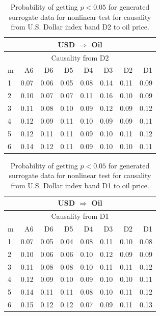 %
%
\begin{table}[H]
\begin{center}
\begin{tabular}{l|r r r r r r r}
\hline\hline
\multicolumn{8}{c}{USD $\Rightarrow$ Oil}\\
\hline
\multicolumn{8}{c}{Causality from D2}\\
\hline\hline
m & A6 & D6 & D5 & D4 & D3 & D2 & D1 \\
\hline
1 & 0.07 & 0.06 & 0.05 & 0.08 & 0.14 & 0.11 & 0.09 \\
2 & 0.10 & 0.07 & 0.07 & 0.11 & 0.16 & 0.10 & 0.09 \\
3 & 0.11 & 0.08 & 0.10 & 0.09 & 0.12 & 0.09 & 0.12 \\
4 & 0.12 & 0.09 & 0.11 & 0.10 & 0.09 & 0.09 & 0.11 \\
5 & 0.12 & 0.11 & 0.11 & 0.09 & 0.10 & 0.11 & 0.12 \\
6 & 0.14 & 0.12 & 0.11 & 0.09 & 0.10 & 0.10 & 0.11 \\
\hline\hline
\end{tabular}
\caption{Probability of getting $p < 0.05$ for generated surrogate data for nonlinear test for causality from U.S. Dollar index band D2 to oil price.}
\end{center}
\end{table}

%
%
\begin{table}[H]
\begin{center}
\begin{tabular}{l|r r r r r r r}
\hline\hline
\multicolumn{8}{c}{USD $\Rightarrow$ Oil}\\
\hline
\multicolumn{8}{c}{Causality from D1}\\
\hline\hline
m & A6 & D6 & D5 & D4 & D3 & D2 & D1 \\
\hline
1 & 0.07 & 0.05 & 0.04 & 0.08 & 0.11 & 0.10 & 0.08 \\
2 & 0.10 & 0.06 & 0.06 & 0.10 & 0.12 & 0.09 & 0.09 \\
3 & 0.11 & 0.08 & 0.08 & 0.10 & 0.11 & 0.11 & 0.12 \\
4 & 0.12 & 0.09 & 0.10 & 0.09 & 0.10 & 0.10 & 0.11 \\
5 & 0.14 & 0.11 & 0.11 & 0.08 & 0.10 & 0.11 & 0.12 \\
6 & 0.15 & 0.12 & 0.12 & 0.07 & 0.09 & 0.11 & 0.13 \\
\hline\hline
\end{tabular}
\caption{Probability of getting $p < 0.05$ for generated surrogate data for nonlinear test for causality from U.S. Dollar index band D1 to oil price.}
\end{center}
\end{table}

